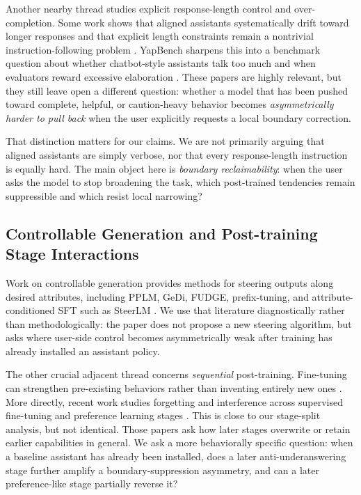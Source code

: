 \documentclass[11pt]{article}
\begin{document}
Another nearby thread studies explicit response-length control and over-completion. Some work shows that aligned assistants systematically drift toward longer responses and that explicit length constraints remain a nontrivial instruction-following problem \citep{zhao2024longismore,yuan2024lengthconstraints}. YapBench sharpens this into a benchmark question about whether chatbot-style assistants talk too much and when evaluators reward excessive elaboration \citep{borisov2026yapbench}. These papers are highly relevant, but they still leave open a different question: whether a model that has been pushed toward complete, helpful, or caution-heavy behavior becomes \emph{asymmetrically harder to pull back} when the user explicitly requests a local boundary correction.

That distinction matters for our claims. We are not primarily arguing that aligned assistants are simply verbose, nor that every response-length instruction is equally hard. The main object here is \emph{boundary reclaimability}: when the user asks the model to stop broadening the task, which post-trained tendencies remain suppressible and which resist local narrowing?

\subsection{Controllable Generation and Post-training Stage Interactions}

Work on controllable generation provides methods for steering outputs along desired attributes, including PPLM, GeDi, FUDGE, prefix-tuning, and attribute-conditioned SFT such as SteerLM \citep{dathathri2020pplm,krause2021gedi,yang2021fudge,li2021prefix,dong2023steerlm,zhang2022ctgsurvey}. We use that literature diagnostically rather than methodologically: the paper does not propose a new steering algorithm, but asks where user-side control becomes asymmetrically weak after training has already installed an assistant policy.

The other crucial adjacent thread concerns \emph{sequential} post-training. Fine-tuning can strengthen pre-existing behaviors rather than inventing entirely new ones \citep{zhou2023lima,prakash2024finetuning}. More directly, recent work studies forgetting and interference across supervised fine-tuning and preference learning stages \citep{fernando2024forgetting}. This is close to our stage-split analysis, but not identical. Those papers ask how later stages overwrite or retain earlier capabilities in general. We ask a more behaviorally specific question: when a baseline assistant has already been installed, does a later anti-underanswering stage further amplify a boundary-suppression asymmetry, and can a later preference-like stage partially reverse it?
\end{document}

